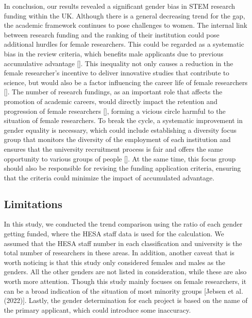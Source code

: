 In conclusion, our results revealed a significant gender bias in STEM research funding within the UK. Although there is a general decreasing trend for the gap, the academic framework continues to pose challenges to women. The internal link between research funding and the ranking of their institution could pose additional hurdles for female researchers. This could be regarded as a systematic bias in the review criteria, which benefits male applicants due to previous accumulative advantage [\cite{Holly2019}]. This inequality not only causes a reduction in the female researcher's incentive to deliver innovative studies that contribute to science, but would also be a factor influencing the career life of female researchers [\cite{jebsen2022dismantling}]. The number of research fundings, as an important role that affects the promotion of academic careers, would directly impact the retention and progression of female researchers [\cite{jebsen2022dismantling}], forming a vicious circle harmful to the situation of female researchers. To break the cycle, a systematic improvement in gender equality is necessary, which could include establishing a diversity focus group that monitors the diversity of the employment of each institution and ensures that the university recruitment process is fair and offers the same opportunity to various groups of people [\cite{sardelis2017ten}]. At the same time, this focus group should also be responsible for revising the funding application criteria, ensuring that the criteria could minimize the impact of accumulated advantage. 

\subsection{Limitations}
In this study, we conducted the trend comparison using the ratio of each gender getting funded, where the HESA staff data is used for the calculation. We assumed that the HESA staff number in each classification and university is the total number of researchers in these areas. In addition, another caveat that is worth noticing is that this study only considered females and males as the genders. All the other genders are not listed in consideration, while these are also worth more attention. Though this study mainly focuses on female researchers, it can be a broad indication of the situation of most minority groups [Jebsen et al. (2022)]. Lastly, the gender determination for each project is based on the name of the primary applicant, which could introduce some inaccuracy.\\
\\
